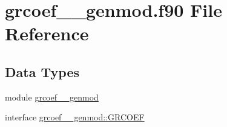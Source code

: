 \hypertarget{grcoef____genmod_8f90}{\section{grcoef\+\_\+\+\_\+genmod.\+f90 File Reference}
\label{grcoef____genmod_8f90}
}
\subsection*{Data Types}
\begin{DoxyCompactItemize}
\item 
module \hyperlink{classgrcoef____genmod}{grcoef\+\_\+\+\_\+genmod}
\item 
interface \hyperlink{interfacegrcoef____genmod_1_1GRCOEF}{grcoef\+\_\+\+\_\+genmod\+::\+G\+R\+C\+O\+E\+F}
\end{DoxyCompactItemize}
